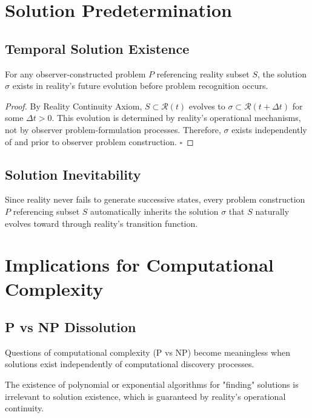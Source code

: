 \documentclass{article}
\begin{document}
\section{Solution Predetermination}

\subsection{Temporal Solution Existence}
\begin{theorem}
For any observer-constructed problem $P$ referencing reality subset $S$, the solution $\sigma$ exists in reality's future evolution before problem recognition occurs.
\end{theorem}

\begin{proof}
By Reality Continuity Axiom, $S \subset \mathcal{R}(t)$ evolves to $\sigma \subset \mathcal{R}(t+\Delta t)$ for some $\Delta t > 0$. This evolution is determined by reality's operational mechanisms, not by observer problem-formulation processes. Therefore, $\sigma$ exists independently of and prior to observer problem construction. $\square$
\end{proof}

\subsection{Solution Inevitability}
Since reality never fails to generate successive states, every problem construction $P$ referencing subset $S$ automatically inherits the solution $\sigma$ that $S$ naturally evolves toward through reality's transition function.

\section{Implications for Computational Complexity}

\subsection{P vs NP Dissolution}
\begin{corollary}
Questions of computational complexity (P vs NP) become meaningless when solutions exist independently of computational discovery processes.
\end{corollary}

The existence of polynomial or exponential algorithms for "finding" solutions is irrelevant to solution existence, which is guaranteed by reality's operational continuity.
\end{document}
